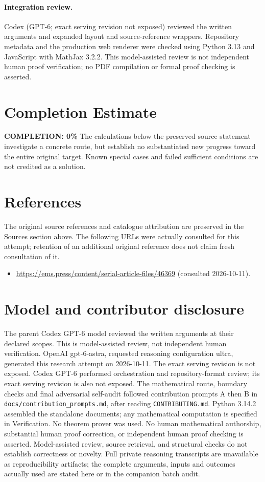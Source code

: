 \documentclass[11pt]{article}
\begin{document}
\paragraph{Integration review.} Codex (GPT-6; exact serving revision not exposed) reviewed the written arguments and expanded layout and source-reference wrappers. Repository metadata and the production web renderer were checked using Python 3.13 and JavaScript with MathJax 3.2.2. This model-assisted review is not independent human proof verification; no PDF compilation or formal proof checking is asserted.

\section{Completion Estimate}
\noindent\textbf{COMPLETION: 0\%}
The calculations below the preserved source statement investigate a concrete route,
but establish no substantiated new progress toward the entire original target.
Known special cases and failed sufficient conditions are not credited as a solution.
\section{References}
The original source references and catalogue attribution are preserved in the
Sources section above. The following URLs were actually consulted for this attempt;
retention of an additional original reference does not claim fresh consultation of it.
\begin{itemize}
\item \url{https://ems.press/content/serial-article-files/46369} (consulted 2026-10-11). 
\end{itemize}
\section{Model and contributor disclosure}
The parent Codex GPT-6 model reviewed the written arguments at their declared scopes. This is model-assisted review, not independent human verification.
OpenAI gpt-6-astra, requested reasoning configuration ultra, generated this research
attempt on 2026-10-11. The exact serving revision is not exposed. Codex GPT-6
performed orchestration and repository-format review; its exact serving revision
is also not exposed. The mathematical route, boundary checks and final adversarial
self-audit followed contribution prompts A then B in
\texttt{docs/contribution\_prompts.md}, after reading \texttt{CONTRIBUTING.md}.
Python 3.14.2 assembled the standalone documents; any mathematical computation is
specified in Verification. No theorem prover was used. No human mathematical
authorship, substantial human proof correction, or independent human proof checking
is asserted. Model-assisted review, source retrieval, and structural checks do not
establish correctness or novelty. Full private reasoning transcripts are unavailable
as reproducibility artifacts; the complete arguments, inputs and outcomes actually
used are stated here or in the companion batch audit.
\end{document}
